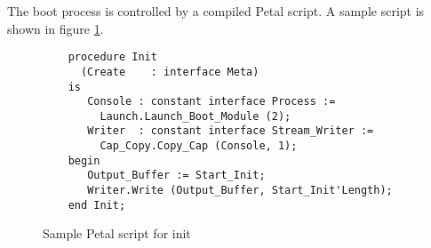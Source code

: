The boot process is controlled by a compiled Petal script.  A sample script is shown in figure {\ref{fig:init.petal}}.

\begin{figure}
    \centering
\begin{verbatim}
    procedure Init
      (Create    : interface Meta)
    is
       Console : constant interface Process :=
         Launch.Launch_Boot_Module (2);
       Writer  : constant interface Stream_Writer :=
         Cap_Copy.Copy_Cap (Console, 1);
    begin
       Output_Buffer := Start_Init;
       Writer.Write (Output_Buffer, Start_Init'Length);
    end Init;
\end{verbatim}
\caption{Sample Petal script for init}
    \label{fig:init.petal}
\end{figure}

